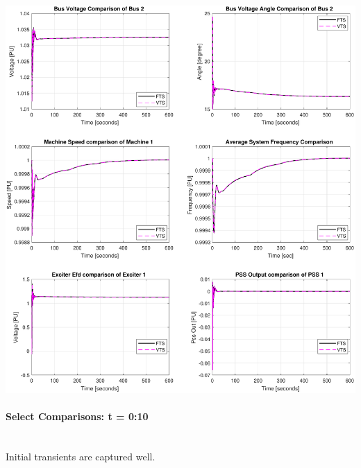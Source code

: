 \documentclass[12pt]{article}
\begin{document}
\includegraphics[width=\linewidth]{MWdetailFull}

\pagebreak
\paragraph{Select Comparisons: t = 0:10} \ \\
Initial transients are captured well.\\
\end{document}
